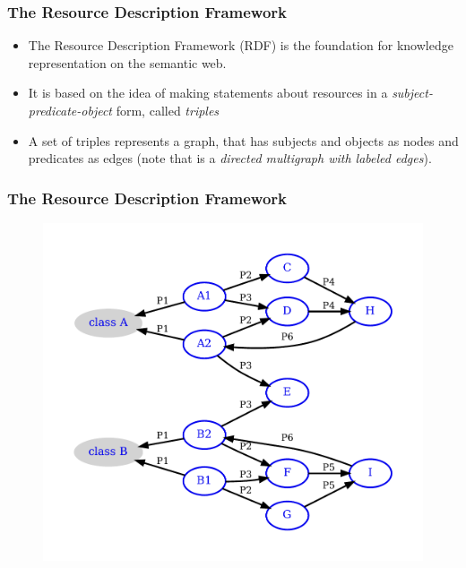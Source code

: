 \documentclass{beamer}
\begin{document}

\begin{frame}
\frametitle{The Resource Description Framework}

\begin{itemize}
\item
The Resource Description Framework (RDF) is the foundation for knowledge representation on the semantic web.

\item
It is based on the  idea of making statements about resources in a \textit{subject-predicate-object} form, called \textit{triples}

\item
A set of triples represents a graph, that has subjects and objects as nodes and predicates as edges (note that is a \textit{directed multigraph with labeled edges}).
\end{itemize}

\end{frame}


\begin{frame}
\frametitle{The Resource Description Framework}

\begin{center}
\begin{figure}
\includegraphics[scale=0.55,keepaspectratio]{img/07-Graph}
\end{figure}
\end{center}

\end{frame}
\end{document}
